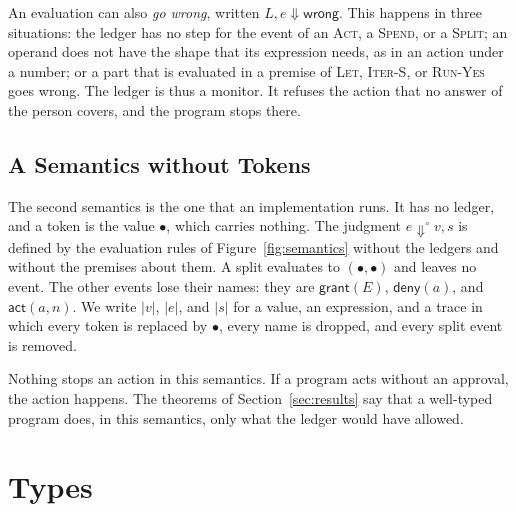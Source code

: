\documentclass[acmsmall,nonacm,screen]{acmart}
\newcommand{\kw}[1]{\mathsf{#1}}
\newcommand{\wrong}{\kw{wrong}}
\newcommand{\evto}{\Downarrow}
\newcommand{\er}[1]{|#1|}
\newcommand{\grant}{\kw{grant}}
\newcommand{\deny}{\kw{deny}}
\newcommand{\evact}{\kw{act}}
\begin{document}
An evaluation can also \emph{go wrong}, written $L, e \evto \wrong$. This happens in three
situations: the ledger has no step for the event of an \textsc{Act}, a \textsc{Spend}, or a
\textsc{Split}; an operand does not have the shape that its expression needs, as in an action
under a number; or a part that is evaluated in a premise of \textsc{Let}, \textsc{Iter-S}, or
\textsc{Run-Yes} goes wrong. The ledger is thus a monitor. It refuses the action that no
answer of the person covers, and the program stops there.

\subsection{A Semantics without Tokens}
\label{sec:erased}

The second semantics is the one that an implementation runs. It has no ledger, and a token is
the value $\bullet$, which carries nothing. The judgment $e \evto^{\circ} v, s$ is defined by
the evaluation rules of Figure~\ref{fig:semantics} without the ledgers and without the
premises about them. A split evaluates to $(\bullet, \bullet)$ and leaves no event. The other
events lose their names: they are $\grant(E)$, $\deny(a)$, and $\evact(a, n)$. We write
$\er{v}$, $\er{e}$, and $\er{s}$ for a value, an expression, and a trace in which every token
is replaced by $\bullet$, every name is dropped, and every split event is removed.

Nothing stops an action in this semantics. If a program acts without an approval, the action
happens. The theorems of Section~\ref{sec:results} say that a well-typed program does, in this
semantics, only what the ledger would have allowed.

\section{Types}
\label{sec:types}
\end{document}
